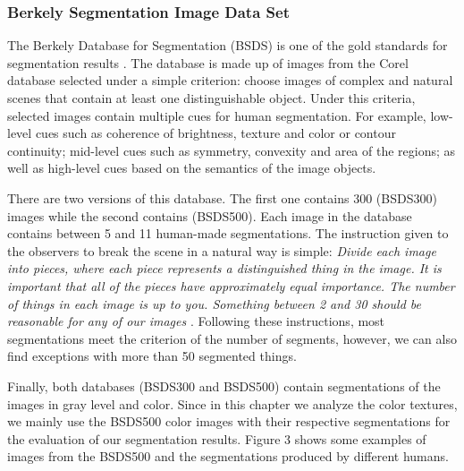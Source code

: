 \subsubsection{Berkely Segmentation Image Data Set}
The Berkely Database for Segmentation (BSDS) is one of the gold standards for segmentation results \citep{Martin.Fowlkes.ea:ICCV:2001}. The database is made up of images from the Corel database selected under a simple criterion: choose images of complex and natural scenes that contain at least one distinguishable object. Under this criteria, selected images contain multiple cues for human segmentation. For example, low-level cues such as coherence of brightness, texture and color or contour continuity; mid-level cues such as symmetry, convexity and area of the regions; as well as high-level cues based on the semantics of the image objects.

There are two versions of this database. The first one contains 300 (BSDS300) images while the second contains (BSDS500). Each image in the database contains between 5 and 11 human-made segmentations. The instruction given to the observers to break the scene in a natural way is simple: \textit{Divide each image into pieces, where each piece represents a distinguished thing in the image. It is important that all of the pieces have approximately equal importance. The number of things in each image is up to you. Something between 2 and 30 should be reasonable for any of our images }\citep{Martin.Fowlkes.ea:ICCV:2001}. Following these instructions, most segmentations meet the criterion of the number of segments, however, we can also find exceptions with more than 50 segmented things.

Finally, both databases (BSDS300 and BSDS500) contain segmentations of the images in gray level and color. Since in this chapter we analyze the color textures, we mainly use the BSDS500 color images with their respective segmentations for the evaluation of our segmentation results. Figure 3 shows some examples of images from the BSDS500 and the segmentations produced by different humans.

